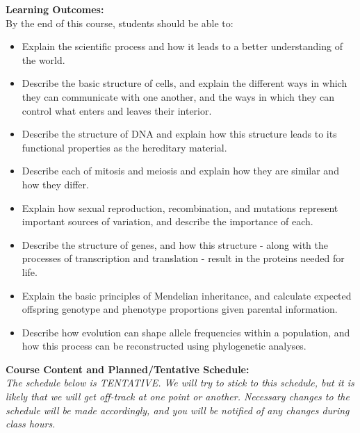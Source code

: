 \documentclass[hidelinks]{article}
\begin{document}
	\newpage
	\textbf{Learning Outcomes:}\\
	By the end of this course, students should be able to:
		\begin{itemize}[topsep=-8pt]
			\item Explain the scientific process and how it leads to a better understanding of the world.
			\item Describe the basic structure of cells, and explain the different ways in which they can communicate with one another, and the ways in which they can control what enters and leaves their interior.
			\item Describe the structure of DNA and explain how this structure leads to its functional properties as the hereditary material.
			\item Describe each of mitosis and meiosis and explain how they are similar and how they differ.
			\item Explain how sexual reproduction, recombination, and mutations represent important sources of variation, and describe the importance of each.
			\item Describe the structure of genes, and how this structure - along with the processes of transcription and translation -  result in the proteins needed for life.
			\item Explain the basic principles of Mendelian inheritance, and calculate expected offspring genotype and phenotype proportions given parental information.
			\item Describe how evolution can shape allele frequencies within a population, and how this process can be reconstructed using phylogenetic analyses.\\
		\end{itemize}
		
		
\textbf{Course Content and Planned/Tentative Schedule:}\\
\emph{The schedule below is TENTATIVE. We will try to stick to this schedule, but it is likely that we will get off-track at one point or another. Necessary changes to the schedule will be made accordingly, and you will be notified of any changes during class hours.}	
\end{document}

